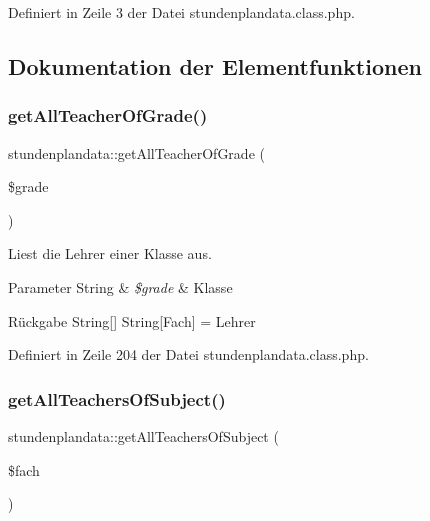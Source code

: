 Definiert in Zeile 3 der Datei stundenplandata.\+class.\+php.



\subsection{Dokumentation der Elementfunktionen}
\mbox{\label{classstundenplandata_afc9416fd68d591237442ba9af00e0d2e}} 
\subsubsection{\texorpdfstring{get\+All\+Teacher\+Of\+Grade()}{getAllTeacherOfGrade()}}
{\footnotesize\ttfamily stundenplandata\+::get\+All\+Teacher\+Of\+Grade (\begin{DoxyParamCaption}\item[{}]{\$grade }\end{DoxyParamCaption})}

Liest die Lehrer einer Klasse aus. 
\begin{DoxyParams}[1]{Parameter}
String & {\em \$grade} & Klasse \\
\hline
\end{DoxyParams}
\begin{DoxyReturn}{Rückgabe}
String\mbox{[}\mbox{]} String\mbox{[}Fach\mbox{]} = Lehrer 
\end{DoxyReturn}


Definiert in Zeile 204 der Datei stundenplandata.\+class.\+php.

\mbox{\label{classstundenplandata_ac8617cfb4d9aac5e8214cd56af94afac}} 
\subsubsection{\texorpdfstring{get\+All\+Teachers\+Of\+Subject()}{getAllTeachersOfSubject()}}
{\footnotesize\ttfamily stundenplandata\+::get\+All\+Teachers\+Of\+Subject (\begin{DoxyParamCaption}\item[{}]{\$fach }\end{DoxyParamCaption})}


